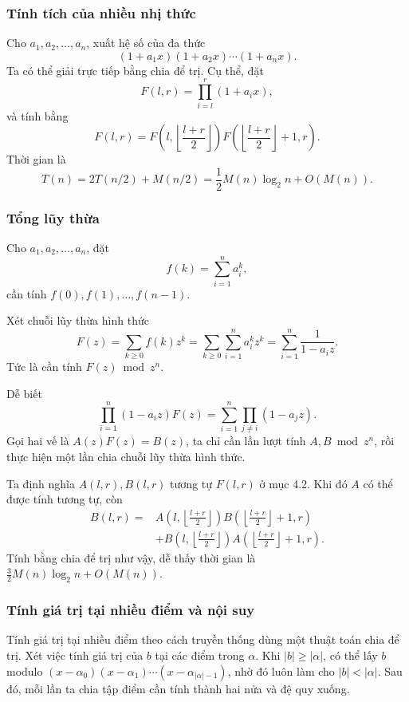 \documentclass[11pt]{article}
\begin{document}
\subsubsection{Tính tích của nhiều nhị thức}

Cho \(a_1,a_2,\ldots,a_n\), xuất hệ số của đa thức
\[
  (1+a_1x)(1+a_2x)\cdots(1+a_nx).
\]
Ta có thể giải trực tiếp bằng chia để trị. Cụ thể, đặt
\[
  F(l,r)=\prod_{i=l}^r(1+a_ix),
\]
và tính bằng
\[
  F(l,r)=F\left(l,\left\lfloor\frac{l+r}{2}\right\rfloor\right)
  F\left(\left\lfloor\frac{l+r}{2}\right\rfloor+1,r\right).
\]
Thời gian là
\[
  T(n)=2T(n/2)+M(n/2)=\frac12M(n)\log_2n+O(M(n)).
\]

\subsubsection{Tổng lũy thừa}

Cho \(a_1,a_2,\ldots,a_n\), đặt
\[
  f(k)=\sum_{i=1}^n a_i^k,
\]
cần tính \(f(0),f(1),\ldots,f(n-1)\).

Xét chuỗi lũy thừa hình thức
\[
  F(z)=\sum_{k\ge 0} f(k)z^k
  =\sum_{k\ge 0}\sum_{i=1}^n a_i^kz^k
  =\sum_{i=1}^n\frac{1}{1-a_iz}.
\]
Tức là cần tính \(F(z)\bmod z^n\).

Dễ biết
\[
  \prod_{i=1}^n(1-a_iz)F(z)
  =\sum_{i=1}^n\prod_{j\ne i}(1-a_jz).
\]
Gọi hai vế là \(A(z)F(z)=B(z)\), ta chỉ cần lần lượt tính
\(A,B\bmod z^n\), rồi thực hiện một lần chia chuỗi lũy thừa hình thức.

Ta định nghĩa \(A(l,r),B(l,r)\) tương tự \(F(l,r)\) ở mục 4.2. Khi đó \(A\) có
thể được tính tương tự, còn
\[
\begin{aligned}
B(l,r)
  ={}& A\left(l,\left\lfloor\frac{l+r}{2}\right\rfloor\right)
      B\left(\left\lfloor\frac{l+r}{2}\right\rfloor+1,r\right)\\
   &+ B\left(l,\left\lfloor\frac{l+r}{2}\right\rfloor\right)
      A\left(\left\lfloor\frac{l+r}{2}\right\rfloor+1,r\right).
\end{aligned}
\]
Tính bằng chia để trị như vậy, dễ thấy thời gian là
\(\frac32M(n)\log_2 n+O(M(n))\).

\subsubsection{Tính giá trị tại nhiều điểm và nội suy}

Tính giá trị tại nhiều điểm theo cách truyền thống dùng một thuật toán chia để
trị. Xét việc tính giá trị của \(b\) tại các điểm trong \(\alpha\). Khi
\(|b|\ge |\alpha|\), có thể lấy \(b\) modulo
\((x-\alpha_0)(x-\alpha_1)\cdots(x-\alpha_{|\alpha|-1})\), nhờ đó luôn làm cho
\(|b|<|\alpha|\). Sau đó, mỗi lần ta chia tập điểm cần tính thành hai nửa và đệ
quy xuống.
\end{document}
